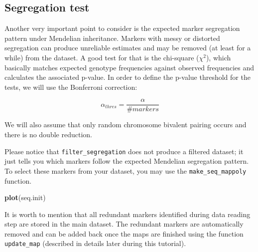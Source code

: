 \documentclass[
]{article}
\newenvironment{Shaded}{}{}
\newcommand{\DataTypeTok}[1]{\textcolor[rgb]{0.56,0.13,0.00}{#1}}
\newcommand{\FloatTok}[1]{\textcolor[rgb]{0.25,0.63,0.44}{#1}}
\newcommand{\KeywordTok}[1]{\textcolor[rgb]{0.00,0.44,0.13}{\textbf{#1}}}
\newcommand{\NormalTok}[1]{#1}
\newcommand{\OperatorTok}[1]{\textcolor[rgb]{0.40,0.40,0.40}{#1}}
\newcommand{\OtherTok}[1]{\textcolor[rgb]{0.00,0.44,0.13}{#1}}
\newcommand{\StringTok}[1]{\textcolor[rgb]{0.25,0.44,0.63}{#1}}
\begin{document}
\hypertarget{segregation-test}{%
\subsection{Segregation test}\label{segregation-test}}

Another very important point to consider is the expected marker
segregation pattern under Mendelian inheritance. Markers with messy or
distorted segregation can produce unreliable estimates and may be
removed (at least for a while) from the dataset. A good test for that is
the chi-square (\(\chi^2\)), which basically matches expected genotype
frequencies against observed frequencies and calculates the associated
p-value. In order to define the p-value threshold for the tests, we will
use the Bonferroni correction:

\[\alpha_{thres} = \frac{\alpha}{\#markers}\]

We will also assume that only random chromosome bivalent pairing occurs
and there is no double reduction.

\begin{Shaded}
\end{Shaded}

Please notice that \texttt{filter\_segregation} does not produce a
filtered dataset; it just tells you which markers follow the expected
Mendelian segregation pattern. To select these markers from your
dataset, you may use the \texttt{make\_seq\_mappoly} function.

\begin{Shaded}
\begin{Highlighting}[]
\KeywordTok{plot}\NormalTok{(seq.init)}
\end{Highlighting}
\end{Shaded}

It is worth to mention that all redundant markers identified during data
reading step are stored in the main dataset. The redundant markers are
automatically removed and can be added back once the maps are finished
using the function \texttt{update\_map} (described in details later
during this tutorial).
\end{document}
